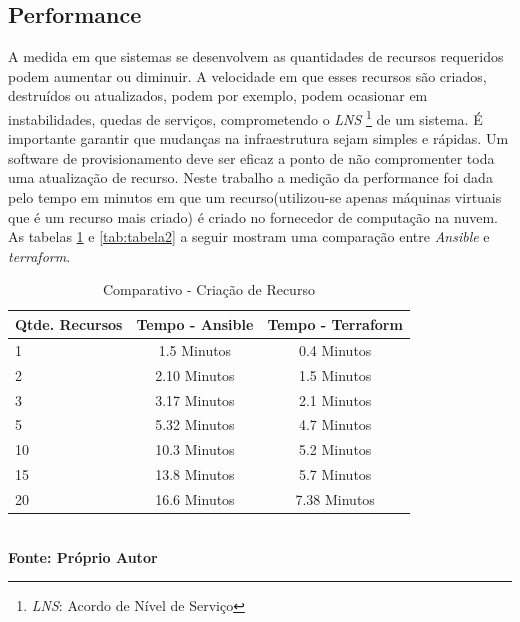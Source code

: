 \subsection{Performance}
A medida em que sistemas se desenvolvem as quantidades de recursos requeridos podem aumentar ou diminuir. A velocidade em que esses recursos são criados, destruídos ou atualizados, podem por exemplo, podem ocasionar em instabilidades, quedas de serviços, comprometendo o \textit{LNS} \footnote{ \textit{LNS}: Acordo de Nível de Serviço} de um sistema. É importante garantir que mudanças na infraestrutura sejam simples e rápidas. Um software de provisionamento deve ser eficaz a ponto de não compromenter toda uma atualização de recurso. Neste trabalho a medição da performance foi dada pelo tempo em minutos em que um recurso(utilizou-se apenas máquinas virtuais que é um recurso mais criado) é criado no fornecedor de computação na nuvem. As tabelas \ref{tab:tabela1} e \ref{tab:tabela2} a seguir mostram uma comparação entre \textit{Ansible} e \textit{terraform}. 


\begin{table}[ht]
	\centering
	\caption{\hspace{0.1cm} Comparativo - Criação de Recurso}
	\vspace{-0.3cm} %
	\label{tab:tabela1}
	\begin{tabular}{l|c|c}
  \hline
    \textbf{Qtde. Recursos}	& \textbf{Tempo - Ansible} & \textbf{Tempo - Terraform} \\
    \hline
  1   & 1.5  Minutos   & 0.4  Minutos    \\
2   & 2.10  Minutos   & 1.5  Minutos    \\
3   & 3.17  Minutos   & 2.1  Minutos    \\
5   & 5.32  Minutos   & 4.7  Minutos     \\
10  & 10.3 Minutos   & 5.2  Minutos      \\
15  & 13.8  Minutos   & 5.7 Minutos      \\
20  & 16.6  Minutos   & 7.38  Minutos      \\

     \hline
 \end{tabular}
 	\vspace{.1cm}  %
	\small
	{\footnotesize\\ \textbf{Fonte: Próprio Autor}}
\end{table}


